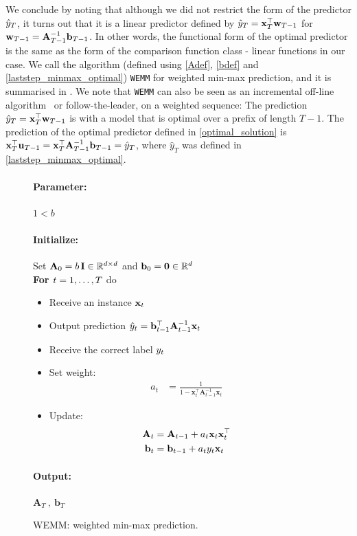 We conclude by noting that although we did not restrict the form of
the predictor $\hat{y}_{T}$, it turns out that it is a linear predictor
defined by $\hat{y}_{T} = {\mathbf{x}}^{\top}_{T}\mathbf{w}_{T-1}$ for $\mathbf{w}_{T-1} =
\mathbf{A}_{T-1}^{-1}\mathbf{b}_{T-1}$. In other words, the functional
form of the optimal predictor is the same as the form of the
comparison function class - linear functions in our case. We call the
algorithm (defined using \eqref{Adef}, \eqref{bdef} and
\eqref{laststep_minmax_optimal}) \texttt{WEMM} for weighted min-max
prediction, and it is summarised in .
We note that \texttt{WEMM}
can also be seen as an incremental off-line
algorithm~\citep{AzouryWa01} or follow-the-leader, on a
weighted sequence: The prediction $\hat{y}_{T} =
{\mathbf{x}}^{\top}_{T}\mathbf{w}_{T-1}$ is with a model that is optimal over a prefix of length $T-1$.  The prediction of the optimal
predictor defined in \eqref{optimal_solution} is
${\mathbf{x}}^{\top}_{T}\mathbf{u}_{T-1}={\mathbf{x}}^{\top}_{T}\mathbf{A}_{T-1}^{-1}\mathbf{b}_{T-1}=\hat{y}_T$,
where $\hat{y}_T$ was defined in \eqref{laststep_minmax_optimal}.

\begin{figure}[t]
{
\paragraph{Parameter:} $1<b$
\paragraph{Initialize:} Set
$\mathbf{A}_{0}=b\,\mathbf{I}\in\mathbb{R}^{d\times d}$ and
$\mathbf{b}_0={\boldsymbol{0}}\in\mathbb{R}^d$\\
{\bf For $t=1 , \ldots , T$} do
\begin{itemize}
\nolineskips
\item Receive an instance $\mathbf{x}_{t}$
\item Output  prediction $\hat{y}_{t}=\mathbf{b}_{t-1}^{\top}\mathbf{A}_{t-1}^{-1}\mathbf{x}_{t}$
\item Receive the correct label $y_{t}$
\item
Set weight:
\begin{align*}
a_{t}&=\frac{1}{1-\mathbf{x}_{t}^{\top}\mathbf{A}_{t-1}^{-1}\mathbf{x}_{t}}
\end{align*}
\item
Update:
\begin{align*}
\mathbf{A}_{t}&=\mathbf{A}_{t-1}+a_{t}\mathbf{x}_{t}\mathbf{x}_{t}^{\top}
\\
\mathbf{b}_{t}&=\mathbf{b}_{t-1}+a_{t}y_{t}\mathbf{x}_{t}
\end{align*}
\end{itemize}
\paragraph{Output:}  $\mathbf{A}_{T} \ ,\ \mathbf{b}_{T}$\\
}
\figline
\caption{WEMM: weighted min-max prediction.}
\label{algorithm:WEMM}
\end{figure}


